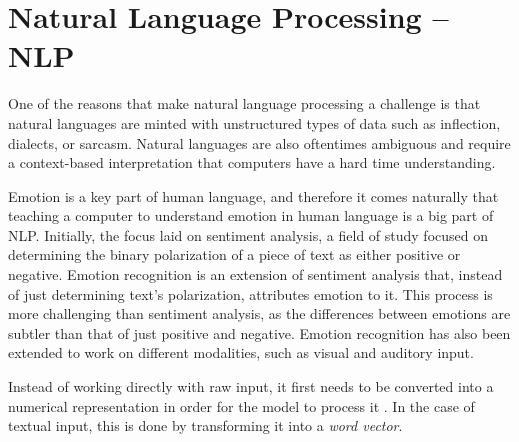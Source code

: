 \documentclass[nofilelist]{cslthse-msc}
\begin{document}












\section{Natural Language Processing -- NLP}
One of the reasons that make natural language processing a challenge is that natural languages are minted with unstructured types of data such as inflection, dialects, or sarcasm. Natural languages are also oftentimes ambiguous and require a context-based interpretation that computers have a hard time understanding. 


Emotion is a key part of human language, and therefore it comes naturally that teaching a computer to understand emotion in human language is a big part of NLP. Initially, the focus laid on sentiment analysis, a field of study focused on determining the binary polarization of a piece of text as either positive or negative. 
Emotion recognition is an extension of sentiment analysis that, instead of just determining text's polarization, attributes emotion to it. This process is more challenging than sentiment analysis, as the differences between emotions are subtler than that of just positive and negative. 
Emotion recognition has also been extended to work on different modalities, such as visual and auditory input.

Instead of working directly with raw input, it first needs to be converted into a numerical representation in order for the model to process it \citep{franoischollet2017learning}. In the case of textual input, this is done by transforming it into a \textit{word vector}.
\end{document}
